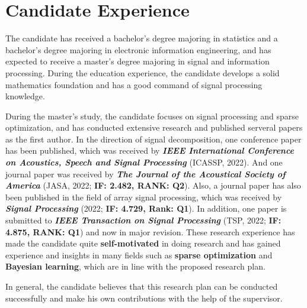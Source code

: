 \documentclass{article}
\begin{document}
	
	\section{Candidate Experience}
	
	\large{
		The candidate has received a bachelor's degree majoring in statistics and a bachelor's degree majoring in electronic information engineering, and has expected to receive a master's degree majoring in signal and information processing. During the education experience, the candidate develops a solid mathematics foundation and has a good command of signal processing knowledge. 
		
		\newpage
		During the master's study, the candidate focuses on signal processing and sparse optimization, and has conducted extensive research and published serveral papers as the first author. In the direction of signal decomposition, one conference paper has been published, which was received by \emph{\textbf{IEEE International Conference on Acoustics, Speech and Signal Processing}} (ICASSP, 2022). And one journal paper was received by \emph{\textbf{The Journal of the Acoustical Society of America}} (JASA, 2022; \textbf{IF: 2.482, RANK: Q2}). Also, a journal paper has also been published in the field of array signal processing, which was received by \emph{\textbf{Signal Processing}} (2022; \textbf{IF: 4.729, Rank: Q1}). In addition, one paper is submitted to \emph{\textbf{IEEE Transaction on Signal Processing}} (TSP, 2022; \textbf{IF: 4.875, RANK: Q1}) and now in major revision. These research experience has made the candidate quite \textbf{self-motivated} in doing research and has gained experience and insights in many fields such as \textbf{sparse optimization} and \textbf{Bayesian learning}, which are in line with the proposed research plan.
		
		In general, the candidate believes that this research plan can be conducted successfully and make his own contributions with the help of the supervisor.
	}
	
	
	
	\
	\




\end{document}
